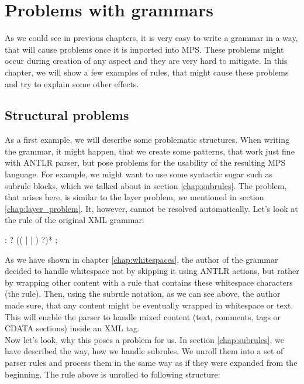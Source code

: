 \chapter{Problems with grammars}
\label{chap:problems_with_grammars}

As we could see in previous chapters, it is very easy to write a grammar in a way, that will cause problems once it is imported into MPS.
These problems might occur during creation of any aspect and they are very hard to mitigate.
In this chapter, we will show a few examples of rules, that might cause these problems and try to explain some other effects.
\\

\section{Structural problems}

As a first example, we will describe some problematic structures.
When writing the grammar, it might happen, that we create some patterns, that work just fine with ANTLR parser, but pose problems for the usability of the resulting MPS language.
For example, we might want to use some syntactic sugar such as subrule blocks, which we talked about in section \ref{chap:subrules}.
The problem, that arises here, is similar to the layer problem, we mentioned in section \ref{chap:layer_problem}.
It, however, cannot be resolved automatically.
Let's look at the  rule of the original XML grammar:

\begin{antlr}
	 :   ? (( |  | ) ?)* ;
\end{antlr}

As we have shown in chapter \ref{chap:whitespaces}, the author of the grammar decided to handle whitespace not by skipping it using ANTLR actions, but rather by wrapping other content with a rule that contains these whitespace characters (the  rule).
Then, using the subrule notation, as we can see above, the author made sure, that any content might be eventually wrapped in whitespace or text.
This will enable the parser to handle mixed content (text, comments, tags or CDATA sections) inside an XML tag.
\\

Now let's look, why this poses a problem for us.
In section \ref{chap:subrules}, we have described the way, how we handle subrules.
We unroll them into a set of parser rules and process them in the same way as if they were expanded from the beginning.
The rule above is unrolled to following structure:


